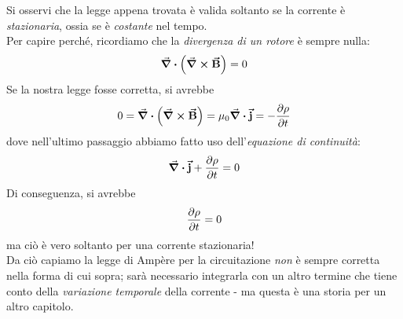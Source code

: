 Si osservi che la legge appena trovata è valida soltanto se la corrente è \textit{stazionaria}, ossia se è \textit{costante} nel tempo.\\
Per capire perché, ricordiamo che la \textit{divergenza di un rotore} è sempre nulla:\label{laleggediAmpereèfalsaepretenziosa}
\begin{equation*}
	\div{\left(\curl{\vb*{\va{B}}}\right)}=0
\end{equation*}
Se la nostra legge fosse corretta, si avrebbe
\begin{equation*}
	0=\div{\left(\curl{\vb*{\va{B}}}\right)}=\mu_0\div{\vb*{\va{j}}}=-\pdv{\rho}{t}
\end{equation*}
dove nell'ultimo passaggio abbiamo fatto uso dell'\textit{equazione di continuità}:
\begin{equation*}
	\div{\vb*{\va{j}}}+\pdv{\rho}{t}=0
\end{equation*}
Di conseguenza, si avrebbe
\begin{equation*}
	\pdv{\rho}{t}=0
\end{equation*}
ma ciò è vero soltanto per una corrente stazionaria!\\
Da ciò capiamo la legge di Ampère per la circuitazione \textit{non} è sempre corretta nella forma di cui sopra; sarà necessario integrarla con un altro termine che tiene conto della \textit{variazione temporale} della corrente - ma questa è una storia per un altro capitolo.

